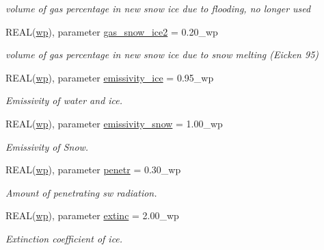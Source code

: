 \begin{DoxyCompactItemize}
\begin{DoxyCompactList}\small\item\em volume of gas percentage in new snow ice due to flooding, no longer used \item\end{DoxyCompactList}\item 
REAL(\hyperlink{namespacemo__parameters_a41be20bed1dcec244405328deaaffe30}{wp}), parameter \hyperlink{namespacemo__parameters_ad2c04994a7c8e261cbdaa50e2790cd56}{gas\_\-snow\_\-ice2} = 0.20\_\-wp
\begin{DoxyCompactList}\small\item\em volume of gas percentage in new snow ice due to snow melting (Eicken 95) \item\end{DoxyCompactList}\item 
REAL(\hyperlink{namespacemo__parameters_a41be20bed1dcec244405328deaaffe30}{wp}), parameter \hyperlink{namespacemo__parameters_a7a1d89915a6383896c6ec8b1a13208e5}{emissivity\_\-ice} = 0.95\_\-wp
\begin{DoxyCompactList}\small\item\em Emissivity of water and ice. \item\end{DoxyCompactList}\item 
REAL(\hyperlink{namespacemo__parameters_a41be20bed1dcec244405328deaaffe30}{wp}), parameter \hyperlink{namespacemo__parameters_abc3aaec08d9a954bf5ddbe3a8ba692e5}{emissivity\_\-snow} = 1.00\_\-wp
\begin{DoxyCompactList}\small\item\em Emissivity of Snow. \item\end{DoxyCompactList}\item 
REAL(\hyperlink{namespacemo__parameters_a41be20bed1dcec244405328deaaffe30}{wp}), parameter \hyperlink{namespacemo__parameters_acf5feb0682a207698942d8764a0fc529}{penetr} = 0.30\_\-wp
\begin{DoxyCompactList}\small\item\em Amount of penetrating sw radiation. \item\end{DoxyCompactList}\item 
REAL(\hyperlink{namespacemo__parameters_a41be20bed1dcec244405328deaaffe30}{wp}), parameter \hyperlink{namespacemo__parameters_a15c1092bdb139242bbe5ca253a9cfc70}{extinc} = 2.00\_\-wp
\begin{DoxyCompactList}\small\item\em Extinction coefficient of ice. \item\end{DoxyCompactList}\item 

\end{DoxyCompactItemize}
